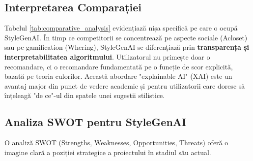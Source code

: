 \subsection{Interpretarea Comparației}

Tabelul \ref{tab:comparative_analysis} evidențiază nișa specifică pe care o ocupă StyleGenAI. În timp ce competitorii se concentrează pe aspecte sociale (Acloset) sau pe gamification (Whering), StyleGenAI se diferențiază prin \textbf{transparența și interpretabilitatea algoritmului}. Utilizatorul nu primește doar o recomandare, ci o recomandare fundamentată pe o funcție de scor explicită, bazată pe teoria culorilor. Această abordare "explainable AI" (XAI) este un avantaj major din punct de vedere academic și pentru utilizatorii care doresc să înțeleagă "de ce"-ul din spatele unei sugestii stilistice.

\subsection{Analiza SWOT pentru StyleGenAI}

O analiză SWOT (Strengths, Weaknesses, Opportunities, Threats) oferă o imagine clară a poziției strategice a proiectului în stadiul său actual.

